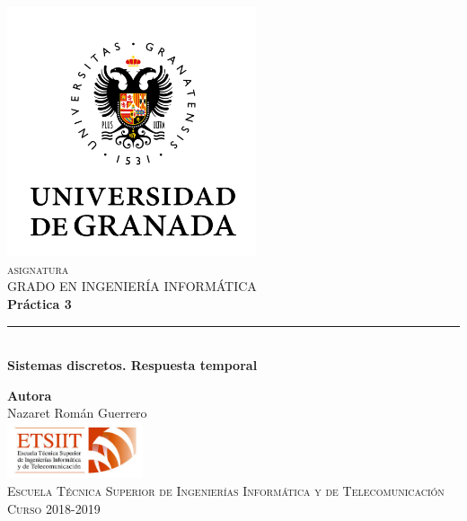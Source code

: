 \documentclass[11pt,a4paper]{article}
\begin{document}
\begin{titlepage}

\begin{minipage}{\textwidth}

\centering
\includegraphics[width=0.55\textwidth]{img/logo.png}\\

\textsc{\Large asignatura\\[0.2cm]}
\textsc{GRADO EN INGENIERÍA INFORMÁTICA}\\[1cm]

{\Huge\bfseries Práctica 3\\}
\noindent\rule[-1ex]{\textwidth}{3pt}\\[3.5ex]
{\large\bfseries Sistemas discretos. Respuesta temporal}
\end{minipage}

\vspace{1.5cm}
\begin{minipage}{\textwidth}
\centering

\textbf{Autora}\\ {Nazaret Román Guerrero}\\[2.5ex]
\includegraphics[width=0.3\textwidth]{img/etsiit.jpeg}\\[0.1cm]
\vspace{1cm}
\textsc{Escuela Técnica Superior de Ingenierías Informática y de Telecomunicación}\\
\vspace{1cm}
\textsc{Curso 2018-2019}
\end{minipage}
\end{titlepage}
\end{document}
